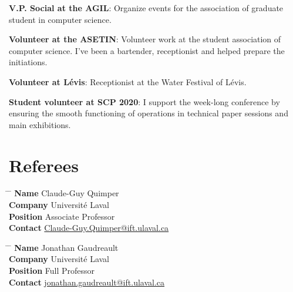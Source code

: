 \documentclass[10pt]{article} %
\begin{document}
\textbf{V.P. Social at the AGIL}: Organize events for the association of graduate student in computer science.

\textbf{Volunteer at the ASETIN}: Volunteer work at the student association of computer science. I've been a bartender, receptionist and helped prepare the initiations.

\textbf{Volunteer at Lévis}: Receptionist at the Water Festival of Lévis.

\textbf{Student volunteer at SCP 2020}: I support the week-­long conference by ensuring the smooth functioning of operations in technical paper sessions and main exhibitions.

\section{Referees}

\parbox{0.5\textwidth}{ 
\begin{tabbing}
\hspace{2.75cm} \= \hspace{4cm} \= \kill 
{\bf Name} \> Claude-Guy Quimper \\ 
{\bf Company} \> Université Laval \\ 
{\bf Position} \> Associate Professor \\  
{\bf Contact} \> \href{mailto:Claude-Guy.Quimper@ift.ulaval.ca}{Claude-Guy.Quimper@ift.ulaval.ca} 
\end{tabbing}}
\hfill 
\parbox{0.5\textwidth}{
\begin{tabbing}
\hspace{2.75cm} \= \hspace{4cm} \= \kill
{\bf Name} \> Jonathan Gaudreault\\ 
{\bf Company} \> Université Laval \\ 
{\bf Position} \> Full Professor \\ 
{\bf Contact} \> \href{mailto:jonathan.gaudreault@ift.ulaval.ca}{jonathan.gaudreault@ift.ulaval.ca}
\end{tabbing}}

\end{document}
